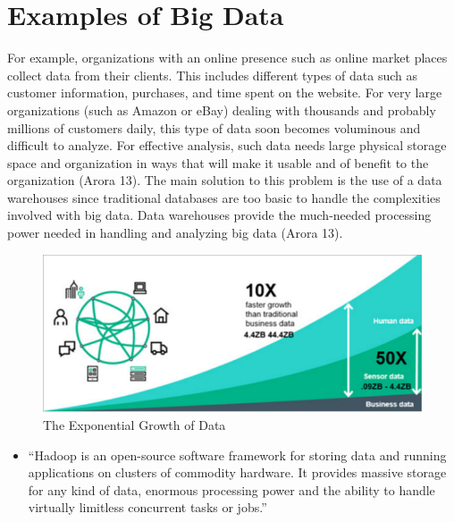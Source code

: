 \documentclass[sigconf]{acmart}
\begin{document}
\section{Examples of Big Data}
For example, organizations with an online presence such as online market places collect data from their clients. This includes different types of data such as customer information, purchases, and time spent on the website. For very large organizations (such as Amazon or eBay) dealing with thousands and probably millions of customers daily, this type of data soon becomes voluminous and difficult to analyze. For effective analysis, such data needs large physical storage space and organization in ways that will make it usable and of benefit to the organization (Arora 13). The main solution to this problem is the use of a data warehouses since traditional databases are too basic to handle the complexities involved with big data. Data warehouses provide the much-needed processing power needed in handling and analyzing big data (Arora 13).
\begin{figure}[!ht]
  \centering\includegraphics[width=\columnwidth]{images/data-growth-rate.png}
  \caption{The Exponential Growth of Data \cite{part-reg}}
  \label{Figure 1}
\end{figure}
\begin{itemize}

  \item ``Hadoop is an open-source software framework for storing data and running applications on clusters of commodity hardware. It provides massive storage for any kind of data, enormous processing power and the ability to handle virtually limitless concurrent tasks or jobs\cite{sas1}.''
\end{itemize}
\end{document}
